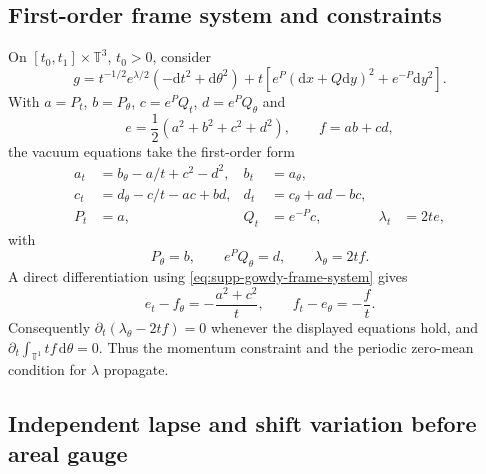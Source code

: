 \documentclass[11pt]{article}
\theoremstyle{definition}
\theoremstyle{remark}
\newcommand{\dd}{\mathrm d}
\begin{document}
\subsection{First-order frame system and constraints}

On $[t_0,t_1]\times\mathbb T^3$, $t_0>0$, consider
\begin{equation}
 g=t^{-1/2}e^{\lambda/2}(-\dd t^2+\dd\theta^2)
 +t\left[e^P(\dd x+Q\dd y)^2+e^{-P}\dd y^2\right].
 \label{eq:supp-gowdy-metric}
\end{equation}
With
$a=P_t$, $b=P_\theta$, $c=e^PQ_t$, $d=e^PQ_\theta$ and
\begin{equation}
 e=\frac12(a^2+b^2+c^2+d^2),\qquad f=ab+cd,
 \label{eq:supp-gowdy-ef}
\end{equation}
the vacuum equations take the first-order form
\begin{align}
 a_t&=b_\theta-a/t+c^2-d^2,&b_t&=a_\theta,\nonumber\\
 c_t&=d_\theta-c/t-ac+bd,&d_t&=c_\theta+ad-bc,\nonumber\\
 P_t&=a,&Q_t&=e^{-P}c,&\lambda_t&=2te,
 \label{eq:supp-gowdy-frame-system}
\end{align}
with
\begin{equation}
 P_\theta=b,\qquad e^PQ_\theta=d,\qquad
 \lambda_\theta=2tf.
 \label{eq:supp-gowdy-coordinate-constraints}
\end{equation}
A direct differentiation using \eqref{eq:supp-gowdy-frame-system} gives
\begin{equation}
 \boxed{
 e_t-f_\theta=-\frac{a^2+c^2}{t},\qquad
 f_t-e_\theta=-\frac ft.}
 \label{eq:supp-gowdy-stress-identities}
\end{equation}
Consequently
$\partial_t(\lambda_\theta-2tf)=0$ whenever the displayed equations hold, and
$\partial_t\int_{\mathbb T^1}tf\,\dd\theta=0$.  Thus the momentum constraint
and the periodic zero-mean condition for $\lambda$ propagate.

\subsection{Independent lapse and shift variation before areal gauge}
\end{document}
